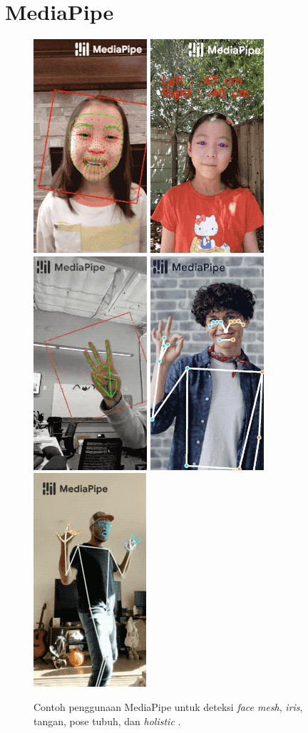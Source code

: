 \section{MediaPipe}
\label{sec:mediapipe}

\begin{figure}[ht]
  \centering
  \includegraphics[height=0.3\textwidth,keepaspectratio]{gambar/contoh-mediapipe-face-mesh.png}
  \includegraphics[height=0.3\textwidth,keepaspectratio]{gambar/contoh-mediapipe-iris.png}
  \includegraphics[height=0.3\textwidth,keepaspectratio]{gambar/contoh-mediapipe-hands.png}
  \includegraphics[height=0.3\textwidth,keepaspectratio]{gambar/contoh-mediapipe-pose.png}
  \includegraphics[height=0.3\textwidth,keepaspectratio]{gambar/contoh-mediapipe-holistic.png}
  \caption{Contoh penggunaan MediaPipe untuk deteksi \emph{face mesh}, \emph{iris}, tangan, pose tubuh, dan \emph{holistic} \citep{url:mediapipe}.}
  \label{fig:contohmediapipe}
\end{figure}

